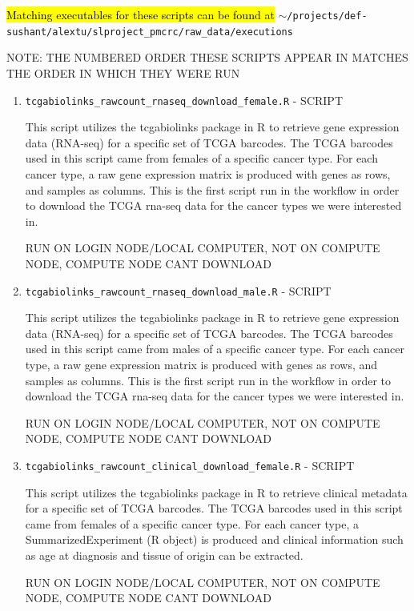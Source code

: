 \documentclass[10pt]{article}
\begin{document}
\hl{Matching executables for these scripts can be found at} \texttt{$\sim$/projects/def-sushant/alextu/\newline slproject\_pmcrc/raw\_data/executions}

NOTE: THE NUMBERED ORDER THESE SCRIPTS APPEAR IN MATCHES THE ORDER IN WHICH THEY WERE RUN

\begin{enumerate}
\item\texttt{tcgabiolinks\_rawcount\_rnaseq\_download\_female.R} - SCRIPT

This script utilizes the tcgabiolinks package in R to retrieve gene expression data (RNA-seq) for a specific set of TCGA barcodes. The TCGA barcodes used in this script came from females of a specific cancer type. For each cancer type, a raw gene expression matrix is produced with genes as rows, and samples as columns. This is the first script run in the workflow in order to download the TCGA rna-seq data for the cancer types we were interested in.

RUN ON LOGIN NODE/LOCAL COMPUTER, NOT ON COMPUTE NODE, COMPUTE NODE CANT DOWNLOAD

\item\texttt{tcgabiolinks\_rawcount\_rnaseq\_download\_male.R} - SCRIPT

This script utilizes the tcgabiolinks package in R to retrieve gene expression data (RNA-seq) for a specific set of TCGA barcodes. The TCGA barcodes used in this script came from males of a specific cancer type. For each cancer type, a raw gene expression matrix is produced with genes as rows, and samples as columns. This is the first script run in the workflow in order to download the TCGA rna-seq data for the cancer types we were interested in.

RUN ON LOGIN NODE/LOCAL COMPUTER, NOT ON COMPUTE NODE, COMPUTE NODE CANT DOWNLOAD

\item\texttt{tcgabiolinks\_rawcount\_clinical\_download\_female.R} - SCRIPT

This script utilizes the tcgabiolinks package in R to retrieve clinical metadata for a specific set of TCGA barcodes. The TCGA barcodes used in this script came from females of a specific cancer type. For each cancer type, a SummarizedExperiment (R object) is produced and clinical information such as age at diagnosis and tissue of origin can be extracted.

RUN ON LOGIN NODE/LOCAL COMPUTER, NOT ON COMPUTE NODE, COMPUTE NODE CANT DOWNLOAD


\end{enumerate}
\end{document}
